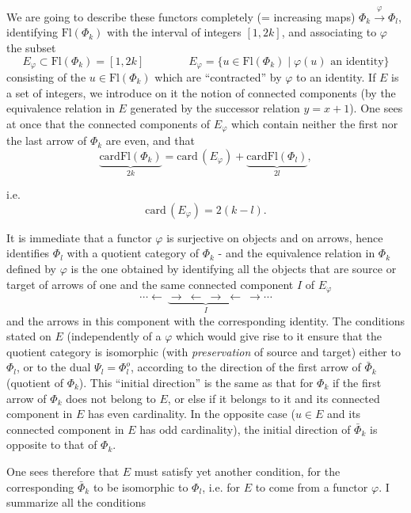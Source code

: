 \documentclass[11pt]{article}
\newcommand{\printedpage}[1]{\marginpar{\footnotesize p.~#1}}
\newcommand{\msp}[1]{\marginpar{\footnotesize [#1]}}
\newcommand{\Fl}{\mathrm{Fl}}
\newcommand{\card}{\mathrm{card}}
\begin{document}
We are going to describe these functors completely (= increasing maps) $\Phi_k\xrightarrow{\varphi}\Phi_l$, identifying $\Fl(\Phi_k)$ with the interval of integers $[1,2k]$, and associating to $\varphi$ the subset
\[
E_\varphi\subset\Fl(\Phi_k)=[1,2k]\qquad\qquad E_\varphi=\{u\in\Fl(\Phi_k)\mid\varphi(u)\text{ an identity}\}
\]
consisting of the $u\in\Fl(\Phi_k)$ which are ``contracted'' by $\varphi$ to an identity. If $E$ is a set of integers, we introduce on it the notion of connected components (by the equivalence relation in $E$ generated by the successor relation $y=x+1$). One sees at once that the connected components of $E_\varphi$ which contain neither the first nor the last arrow of $\Phi_k$ are even, and that %
\[
\underbrace{\card\Fl(\Phi_k)}_{2k}=\card\,(E_\varphi)+\underbrace{\card\Fl(\Phi_l)}_{2l},
\]

\msp{page 18}
i.e.
\[
\card\,(E_\varphi)=2(k-l).
\]


\printedpage{12}

It is immediate that a functor $\varphi$ is surjective on objects and on arrows, hence identifies $\Phi_l$ with a quotient category of $\Phi_k$ - and the equivalence relation in $\Phi_k$ defined by $\varphi$ is the one obtained by identifying all the objects that are source or target of arrows of one and the same connected component $I$ of $E_\varphi$
\[
\cdots\longleftarrow\ \underbrace{\longrightarrow\ \longleftarrow\ \longrightarrow\ \longleftarrow}_{I}\ \longrightarrow\cdots
\]
and the arrows in this component with the corresponding identity. The conditions stated on $E$ (independently of a $\varphi$ which would give rise to it ensure that the quotient category is isomorphic (with \textit{preservation} of source and target) either to $\Phi_l$, or to the dual $\Psi_l=\Phi_l^o$, according to the direction of the first arrow of $\bar{\Phi}_k$ (quotient of $\Phi_k$). This ``initial direction'' is the same as that for $\Phi_k$ if the first arrow of $\Phi_k$ does not belong to $E$, or else if it belongs to it and its connected component in $E$ has even cardinality. In the opposite case ($u\in E$ and its connected component in $E$ has odd cardinality), the initial direction of $\bar{\Phi}_k$ is opposite to that of $\Phi_k$. %

\msp{page 19}
One sees therefore that $E$ must satisfy yet another condition, for the corresponding $\bar{\Phi}_k$ to be isomorphic to $\Phi_l$, i.e. for $E$ to come from a functor $\varphi$. I summarize all the conditions
\end{document}
